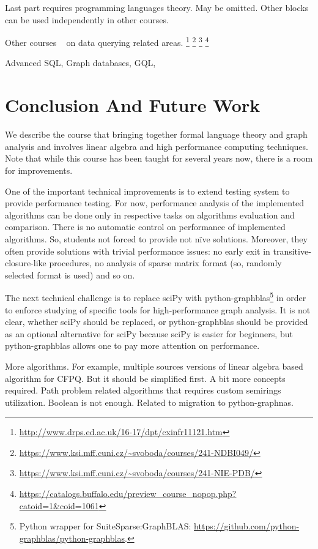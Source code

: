 \documentclass[sigconf]{acmart}
\begin{document}
Last part requires programming languages theory. May be omitted. Other blocks can be used independently in other courses.

Other courses ~\cite{Figueira2022} on data querying related areas.
\footnote{\url{http://www.drps.ed.ac.uk/16-17/dpt/cxinfr11121.htm}}
\footnote{\url{https://www.ksi.mff.cuni.cz/~svoboda/courses/241-NDBI049/}}
\footnote{\url{https://www.ksi.mff.cuni.cz/~svoboda/courses/241-NIE-PDB/}}
\footnote{\url{https://catalogs.buffalo.edu/preview_course_nopop.php?catoid=1&coid=1061}}

Advanced SQL, Graph databases, GQL, 

\section{Conclusion And Future Work}

We describe the course that bringing together formal language theory and graph analysis and involves linear algebra and high performance computing techniques.
Note that while this course has been taught for several years now, there is a room for improvements.

One of the important technical improvements is to extend testing system to provide performance testing. 
For now, performance analysis of the implemented algorithms can be done only in respective tasks on algorithms evaluation and comparison.
There is no automatic control on performance of implemented algorithms. 
So, students not forced to provide not n\"ive solutions.
Moreover, they often provide solutions with trivial performance issues: no early exit in transitive-closure-like procedures, no analysis of sparse matrix format (so, randomly selected format is used) and so on.

The next technical challenge is to replace sciPy with python-graphblas\footnote{Python wrapper for SuiteSparse:GraphBLAS: \url{https://github.com/python-graphblas/python-graphblas}.} in order to enforce studying of specific tools for high-performance graph analysis. 
It is not clear, whether sciPy should be replaced, or python-graphblas should be provided as an optional alternative for sciPy because sciPy is easier for beginners, but python-graphblas allows one to pay more attention on performance.

More algorithms.
For example, multiple sources versions of linear algebra based algorithm for CFPQ.
But it should be simplified first.
A bit more concepts required.
Path problem related algorithms that requires custom semirings utilization. 
Boolean is not enough.
Related to migration to python-graphnas.
\end{document}
